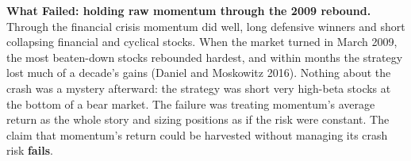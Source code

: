 \begin{callout}
\textbf{What Failed: holding raw momentum through the 2009 rebound.} Through the financial crisis momentum did well, long defensive winners and short collapsing financial and cyclical stocks. When the market turned in March 2009, the most beaten-down stocks rebounded hardest, and within months the strategy lost much of a decade's gains (Daniel and Moskowitz 2016). Nothing about the crash was a mystery afterward: the strategy was short very high-beta stocks at the bottom of a bear market. The failure was treating momentum's average return as the whole story and sizing positions as if the risk were constant. The claim that momentum's return could be harvested without managing its crash risk \textbf{fails}.
\end{callout}
